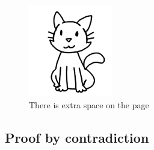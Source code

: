 \documentclass[a4paper,12pt]{book}
\begin{document}
        ~\\~\\
        \begin{figure}[h]
            \centering
            \includegraphics[height=4cm]{images/cat.png}
            \caption*{There is extra space on the page}
        \end{figure}
    
    \newpage
    \subsection{Proof by contradiction}
\end{document}
